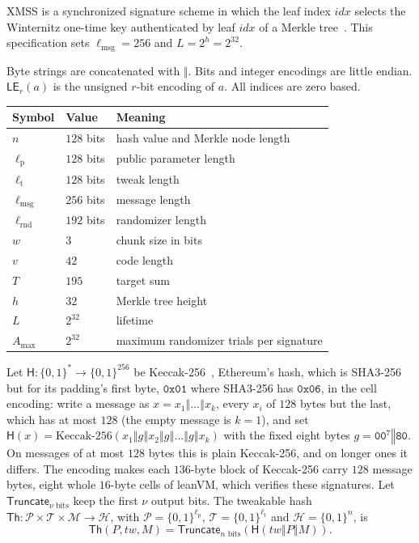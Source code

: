 \documentclass[11pt]{article}
\theoremstyle{definition}
\theoremstyle{plain}
\theoremstyle{remark}
\newcommand{\bits}[1]{\{0,1\}^{#1}}
\newcommand{\Th}{\mathsf{Th}}
\newcommand{\hash}{\mathsf{H}}
\newcommand{\LE}{\mathsf{LE}}
\newcommand{\Truncate}{\mathsf{Truncate}}
\newcommand{\concat}{\mathbin\Vert}
\newcommand{\idx}{\mathit{idx}}
\newcommand{\tw}{\mathit{tw}}
\newcommand{\lmsg}{\ell_{\mathrm{msg}}}
\newcommand{\lpar}{\ell_{\mathrm{p}}}
\newcommand{\ltwk}{\ell_{\mathrm{t}}}
\newcommand{\lrnd}{\ell_{\mathrm{rnd}}}
\newcommand{\amax}{A_{\max}}
\begin{document}
XMSS is a synchronized signature scheme in which the leaf index $\idx$ selects the Winternitz one-time key authenticated by leaf $\idx$ of a Merkle tree~\cite{RFC8391}. This specification sets $\lmsg=256$ and $L=2^h=2^{32}$.

Byte strings are concatenated with $\concat$. Bits and integer encodings are little endian. $\LE_r(a)$ is the unsigned $r$-bit encoding of $a$. All indices are zero based.

\begin{center}
\begin{tabular}{@{}lll@{}}
\toprule
Symbol & Value & Meaning\\
\midrule
$n$ & $128$ bits & hash value and Merkle node length\\
$\lpar$ & $128$ bits & public parameter length\\
$\ltwk$ & $128$ bits & tweak length\\
$\lmsg$ & $256$ bits & message length\\
$\lrnd$ & $192$ bits & randomizer length\\
$w$ & $3$ & chunk size in bits\\
$v$ & $42$ & code length\\
$T$ & $195$ & target sum\\
$h$ & $32$ & Merkle tree height\\
$L$ & $2^{32}$ & lifetime\\
$\amax$ & $2^{32}$ & maximum randomizer trials per signature\\
\bottomrule
\end{tabular}
\end{center}

Let $\hash:\bits{*}\to\bits{256}$ be Keccak-256~\cite{keccak}, Ethereum's hash, which is SHA3-256~\cite{fips202} but for its padding's first byte, $\mathtt{0x01}$ where SHA3-256 has $\mathtt{0x06}$, in the cell encoding: write a message as $x=x_1\concat\dots\concat x_k$, every $x_i$ of $128$ bytes but the last, which has at most $128$ (the empty message is $k=1$), and set $\hash(x)=\mathrm{Keccak\text{-}256}(x_1\concat g\concat x_2\concat g\concat\dots\concat g\concat x_k)$ with the fixed eight bytes $g=\mathtt{00}^7\concat\mathtt{80}$. On messages of at most $128$ bytes this is plain Keccak-256, and on longer ones it differs. The encoding makes each $136$-byte block of Keccak-256 carry $128$ message bytes, eight whole $16$-byte cells of leanVM, which verifies these signatures. Let $\Truncate_{\nu\text{ bits}}$ keep the first $\nu$ output bits. The tweakable hash $\Th:\mathcal P\times\mathcal T\times\mathcal M\to\mathcal H$, with $\mathcal P=\bits{\lpar}$, $\mathcal T=\bits{\ltwk}$ and $\mathcal H=\bits{n}$, is
\[
  \Th(P,\tw,M)=\Truncate_{n\text{ bits}}\!\left(\hash(\tw\concat P\concat M)\right).
\]
\end{document}

